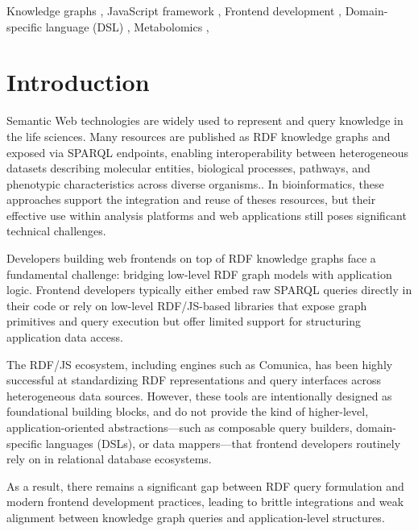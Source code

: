 \documentclass[
]{ceurart}
\begin{document}
\begin{keywords}
  Knowledge graphs \sep
  JavaScript framework \sep
  Frontend development \sep
  Domain-specific language (DSL) \sep
  Metabolomics \sep
\end{keywords}

\maketitle

\section{Introduction}

Semantic Web technologies are widely used to represent and query knowledge in the life sciences.\citep{wu_semantic_2014} 
Many resources are published as RDF knowledge graphs and exposed via SPARQL endpoints, enabling interoperability between heterogeneous 
datasets describing molecular entities, biological processes, pathways, and phenotypic characteristics across diverse organisms.\citep{wilkinson_fair_2016}.
In bioinformatics, these approaches support the integration and reuse of theses resources, but their effective use within analysis platforms 
and web applications still poses significant technical challenges.

Developers building web frontends on top of RDF knowledge graphs face a fundamental challenge: bridging low-level RDF graph models with application 
logic. Frontend developers typically either embed raw SPARQL queries directly in their code or rely on low-level RDF/JS-based libraries that expose 
graph primitives and query execution but offer limited support for structuring application data access.

The RDF/JS ecosystem, including engines such as Comunica, has been highly successful at standardizing RDF representations and query interfaces 
across heterogeneous data sources. However, these tools are intentionally designed as foundational building blocks, and do not provide the kind 
of higher-level, application-oriented abstractions—such as composable query builders, domain-specific languages (DSLs), or data mappers—that 
frontend developers routinely rely on in relational database ecosystems.

As a result, there remains a significant gap between RDF query formulation and modern frontend development practices, 
leading to brittle integrations and weak alignment between knowledge graph queries and application-level structures.
\end{document}
